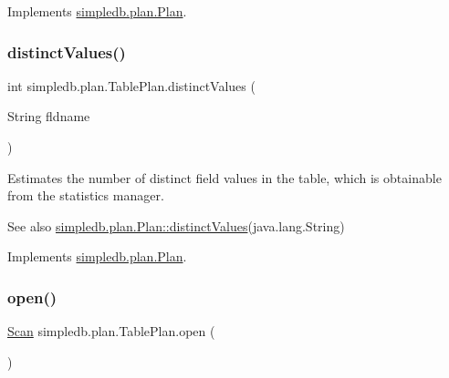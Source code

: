 Implements \hyperlink{interfacesimpledb_1_1plan_1_1Plan_a6a333b95b956fe224812155b9d1c8202}{simpledb.\+plan.\+Plan}.

\mbox{\label{classsimpledb_1_1plan_1_1TablePlan_a07271b00072ebfcc314da8f4be7a93f4}} 
\subsubsection{\texorpdfstring{distinct\+Values()}{distinctValues()}}
{\footnotesize\ttfamily int simpledb.\+plan.\+Table\+Plan.\+distinct\+Values (\begin{DoxyParamCaption}\item[{String}]{fldname }\end{DoxyParamCaption})\hspace{0.3cm}{\ttfamily [inline]}}

Estimates the number of distinct field values in the table, which is obtainable from the statistics manager. \begin{DoxySeeAlso}{See also}
\hyperlink{interfacesimpledb_1_1plan_1_1Plan_a55094c16c756b0c09b5c71b94d573271}{simpledb.\+plan.\+Plan\+::distinct\+Values}(java.\+lang.\+String) 
\end{DoxySeeAlso}


Implements \hyperlink{interfacesimpledb_1_1plan_1_1Plan_a55094c16c756b0c09b5c71b94d573271}{simpledb.\+plan.\+Plan}.

\mbox{\label{classsimpledb_1_1plan_1_1TablePlan_afb47e9016581a59788ec4de4c672cf76}} 
\subsubsection{\texorpdfstring{open()}{open()}}
{\footnotesize\ttfamily \hyperlink{interfacesimpledb_1_1query_1_1Scan}{Scan} simpledb.\+plan.\+Table\+Plan.\+open (\begin{DoxyParamCaption}{ }\end{DoxyParamCaption})\hspace{0.3cm}{\ttfamily [inline]}}

